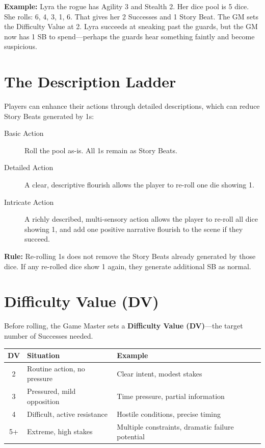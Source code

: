 \documentclass[11pt,twoside,openany]{book}
\begin{document}
\textbf{Example:} Lyra the rogue has Agility 3 and Stealth 2. Her dice pool is 5 dice. She rolls: 6, 4, 3, 1, 6. That gives her 2 Successes and 1 Story Beat. The GM sets the Difficulty Value at 2. Lyra succeeds at sneaking past the guards, but the GM now has 1 SB to spend---perhaps the guards hear something faintly and become suspicious.

\section*{The Description Ladder} 

Players can enhance their actions through detailed descriptions, which can reduce Story Beats generated by 1s:

\begin{description}
\item[Basic Action] Roll the pool as-is. All 1s remain as Story Beats.
\item[Detailed Action] A clear, descriptive flourish allows the player to re-roll one die showing 1.
\item[Intricate Action] A richly described, multi-sensory action allows the player to re-roll all dice showing 1, and add one positive narrative flourish to the scene if they succeed.
\end{description}

\textbf{Rule:} Re-rolling 1s does not remove the Story Beats already generated by those dice. If any re-rolled dice show 1 again, they generate additional SB as normal.

\section*{Difficulty Value (DV)} 

Before rolling, the Game Master sets a \textbf{Difficulty Value (DV)}---the target number of Successes needed.

\begin{center}
\begin{tabular}{|c|l|l|}
\hline
\textbf{DV} & \textbf{Situation} & \textbf{Example} \\
\hline
2 & Routine action, no pressure & Clear intent, modest stakes \\
3 & Pressured, mild opposition & Time pressure, partial information \\
4 & Difficult, active resistance & Hostile conditions, precise timing \\
5+ & Extreme, high stakes & Multiple constraints, dramatic failure potential \\
\hline
\end{tabular}
\end{center}
\end{document}
